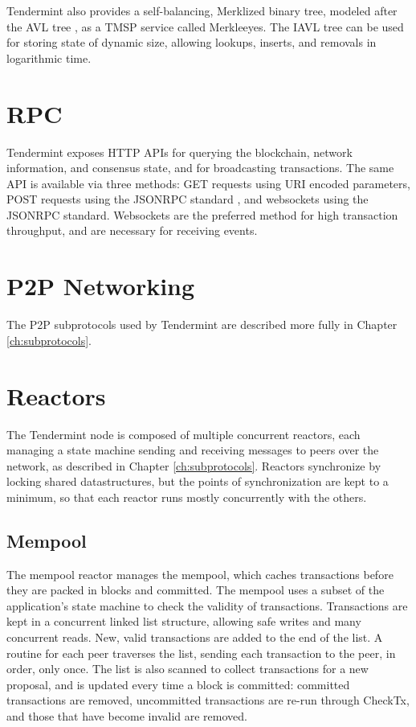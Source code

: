Tendermint also provides a self-balancing, Merklized binary tree, modeled after the AVL tree \cite{avl}, as a TMSP service called Merkleeyes.
The IAVL tree can be used for storing state of dynamic size, allowing lookups, inserts, and removals in logarithmic time.

\section{RPC}

Tendermint exposes HTTP APIs for querying the blockchain, network information, and consensus state, and for broadcasting transactions.
The same API is available via three methods: GET requests using URI encoded parameters, POST requests using the JSONRPC standard \cite{jsonrpc}, 
and websockets using the JSONRPC standard. Websockets are the preferred method for high transaction throughput, 
and are necessary for receiving events.


\section{P2P Networking}

The P2P subprotocols used by Tendermint are described more fully in Chapter \ref{ch:subprotocols}.

\section{Reactors}

The Tendermint node is composed of multiple concurrent reactors, 
each managing a state machine sending and receiving messages to peers over the network, as described in Chapter \ref{ch:subprotocols}.
Reactors synchronize by locking shared datastructures, but the points of synchronization are kept to a minimum,
so that each reactor runs mostly concurrently with the others.

\subsection{Mempool}

The mempool reactor manages the mempool, 
which caches transactions before they are packed in blocks and committed.
The mempool uses a subset of the application's state machine to check the validity of transactions.
Transactions are kept in a concurrent linked list structure, allowing safe writes and many concurrent reads.
New, valid transactions are added to the end of the list. 
A routine for each peer traverses the list, sending each transaction to the peer, in order, only once.
The list is also scanned to collect transactions for a new proposal, 
and is updated every time a block is committed: committed transactions are removed, 
uncommitted transactions are re-run through CheckTx, and those that have become invalid are removed.

